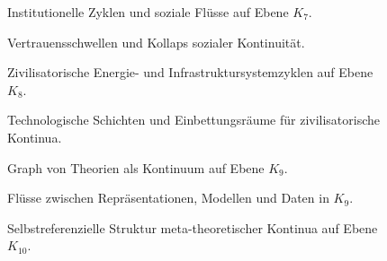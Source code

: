 \begin{figure}[p]
  \centering
  
  \caption{Institutionelle Zyklen und soziale Flüsse auf Ebene
           \texorpdfstring{\(K_7\)}{K_7}.}
  \label{fig:institutional-cycles}
\end{figure}

\begin{figure}[p]
  \centering
  
  \caption{Vertrauensschwellen und Kollaps sozialer Kontinuität.}
  \label{fig:trust-threshold}
\end{figure}

\begin{figure}[p]
  \centering
  
  \caption{Zivilisatorische Energie- und Infrastruktursystemzyklen auf Ebene
           \texorpdfstring{\(K_8\)}{K_8}.}
  \label{fig:civilization-energy-cycles}
\end{figure}

\begin{figure}[p]
  \centering
  
  \caption{Technologische Schichten und Einbettungsräume für
           zivilisatorische Kontinua.}
  \label{fig:technological-layers-m8}
\end{figure}

\begin{figure}[p]
  \centering
  
  \caption{Graph von Theorien als Kontinuum auf Ebene
           \texorpdfstring{\(K_9\)}{K_9}.}
  \label{fig:theory-graph}
\end{figure}

\begin{figure}[p]
  \centering
  
  \caption{Flüsse zwischen Repräsentationen, Modellen und Daten in
           \texorpdfstring{\(K_9\)}{K_9}.}
  \label{fig:representation-flow-graph}
\end{figure}

\begin{figure}[p]
  \centering
  
  \caption{Selbstreferenzielle Struktur meta-theoretischer Kontinua auf Ebene
           \(K_{10}\).}
  \label{fig:metatheory-k10-selfreference}
\end{figure}

